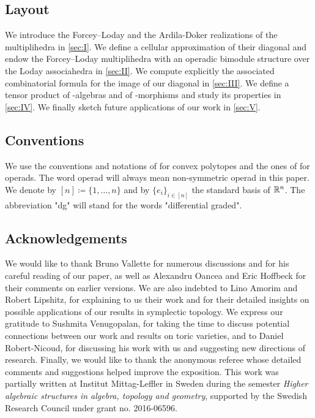 \documentclass[10pt]{amsart}
\theoremstyle{remark}
\begin{document}
\subsection*{Layout} 
We introduce the Forcey--Loday and the Ardila-Doker realizations of the multiplihedra in \cref{sec:I}. 
We define a cellular approximation of their diagonal and endow the Forcey--Loday multiplihedra with an operadic bimodule structure over the Loday associahedra in \cref{sec:II}.
We compute explicitly the associated combinatorial formula for the image of our diagonal in \cref{sec:III}. 
We define a tensor product of \Ainf -algebras and of \Ainf -morphisms and study its properties in \cref{sec:IV}.
We finally sketch future applications of our work in \cref{sec:V}.

\subsection*{Conventions} 
We use the conventions and notations of \cite{Ziegler95} for convex polytopes and the ones of \cite{LodayVallette12} for operads. 
The word operad will always mean non-symmetric operad \cite[Section 5.2.8]{LodayVallette12} in this paper. 
We denote by $[n]\coloneqq \{1,\ldots,n\}$ and by $\{ e_i\}_{i \in [n]}$ the standard basis of $\mathbb{R}^n$.
The abbreviation "dg" will stand for the words "differential graded". 

\subsection*{Acknowledgements} 
We would like to thank Bruno Vallette for numerous discussions and for his careful reading of our paper, as well as Alexandru Oancea and Eric Hoffbeck for their comments on earlier versions.
We are also indebted to Lino Amorim and Robert Lipshitz, for explaining to us their work and for their detailed insights on possible applications of our results in symplectic topology. 
We express our gratitude to Sushmita Venugopalan, for taking the time to discuss potential connections between our work and results on toric varieties, and to Daniel Robert-Nicoud, for discussing his work with us and suggesting new directions of research. 
Finally, we would like to thank the anonymous referee whose detailed comments and suggestions helped improve the exposition.
This work was partially written at Institut Mittag-Leffler in Sweden during the semester \emph{Higher algebraic structures in algebra, topology and geometry}, supported by the Swedish Research Council under grant no. 2016-06596.
\end{document}
